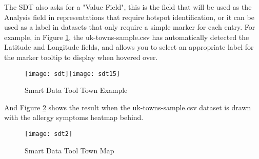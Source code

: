 The SDT also asks for a "Value Field", this is the field that will be used as the Analysis field in representations that require hotspot identification, or it can be used as a label in datasets that only require a simple marker for each entry. For example, in Figure \ref{fig:sdt}, the uk-towns-sample.csv has automatically detected the Latitude and Longitude fields, and allows you to select an appropriate label for the marker tooltip to display when hovered over.\\

\begin{figure}[H]
\begin{center}
\texttt{[image: sdt]}\texttt{[image: sdt15]}
\caption{Smart Data Tool Town Example}
\label{fig:sdt}
\end{center}
\end{figure}

And Figure \ref{fig:sdt2} shows the result when the uk-towns-sample.csv dataset is drawn with the allergy symptoms heatmap behind.

\begin{figure}[H]
\begin{center}
\texttt{[image: sdt2]}
\caption{Smart Data Tool Town Map}
\label{fig:sdt2}
\end{center}
\end{figure}